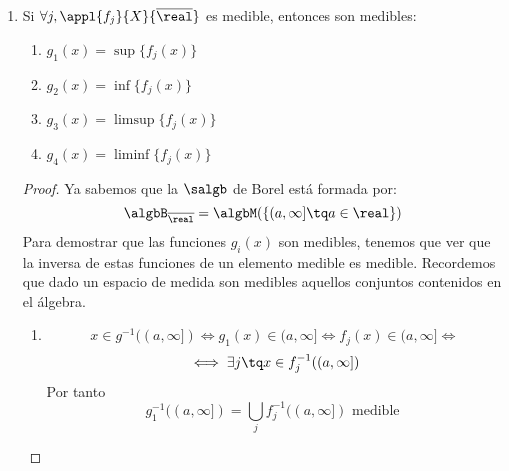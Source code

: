 \documentclass{apuntes}
\begin{document}
\begin{enumerate}
\begin{proof}
Si ahora componemos estas dos funciones obtenemos una función que sigue siendo medible y que a cada a cada $x$ le asocia $f(x)+g(x)$.

Lo mismo puede hacerse con el producto.
\end{proof}


\begin{defn} Definimos $\overline{ℝ} = [-∞, +∞] = ℝ \cup \{+∞, -∞\}$, es decir consideramos en conjunto de los reales y le añadimos $\pm \infty$
\end{defn}

La $\salgb$ de Borel en $\overline{ℝ}$ ($\algbB_{\overline{ℝ}}$), está generada por:
\begin{enumerate}
\item $\{(a, +∞]: a ∈ ℝ\}$
\item $\{[-∞, a): a ∈ ℝ\}$
\end{enumerate}

\obs $\algbB_{ℝ} ⊆ \algbB_{\overline{ℝ}}$

La propiedad 7 la podemos extender a funciones $\appl{f}{X}{\overline{ℝ}}$, siempre que se defina de forma adecuada:
\[0 · (\pm∞) = 0\]
\[+∞ + (-∞) = 0\]


\item Si $\forall j, \appl{f_j}{X}{\overline{\real}}$ es medible, entonces son medibles:
\begin{enumerate}
\item $g_1(x)=\sup\{f_j(x)\}$
\item $g_2(x)=\inf\{f_j(x)\}$
\item $g_3(x)=\limsup\{f_j(x)\}$
\item $g_4(x)=\liminf\{f_j(x)\}$
\end{enumerate}

\begin{proof}
Ya sabemos que la $\salgb$ de Borel está formada por:
\[\algbB_{\overline{\real}} = \algbM(\{(a, \infty] \tq a \in \real\})\]
Para demostrar que las funciones $g_i(x)$ son medibles, tenemos que ver que la inversa de estas funciones de un elemento medible es medible. Recordemos que dado un espacio de medida son medibles aquellos conjuntos contenidos en el álgebra.
\begin{enumerate}
\item
\[x \in g^{-1}((a, \infty]) \iff g_1(x) \in (a, \infty] \iff f_j(x) \in (a, \infty] \iff \]
\[\iff \exists j \tq x \in f^{-1}_j((a, \infty])\]
Por tanto
\[g^{-1}_1((a, \infty]) = \bigcup_j f^{-1}_j((a, \infty]) \text{ medible }\]


\end{enumerate}
\end{proof}
\end{enumerate}
\end{document}
